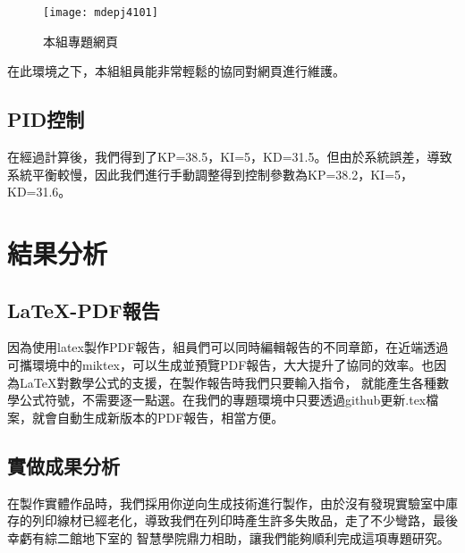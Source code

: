 \begin{figure}[h]
    \centering
    \texttt{[image: mdepj4101]}
    \caption{本組專題網頁}
\end{figure}

在此環境之下，本組組員能非常輕鬆的協同對網頁進行維護。\\




\subsection{PID控制}
在經過計算後，我們得到了KP=38.5，KI=5，KD=31.5。但由於系統誤差，導致系統平衡較慢，因此我們進行手動調整得到控制參數為KP=38.2，KI=5，KD=31.6。\\



\section{結果分析}

\subsection{LaTeX-PDF報告}
因為使用latex製作PDF報告，組員們可以同時編輯報告的不同章節，在近端透過可攜環境中的miktex，可以生成並預覽PDF報告，大大提升了協同的效率。也因為LaTeX對數學公式的支援，在製作報告時我們只要輸入指令，
就能產生各種數學公式符號，不需要逐一點選。在我們的專題環境中只要透過github更新.tex檔案，就會自動生成新版本的PDF報告，相當方便。\\

\subsection{實做成果分析}
在製作實體作品時，我們採用你逆向生成技術進行製作，由於沒有發現實驗室中庫存的列印線材已經老化，導致我們在列印時產生許多失敗品，走了不少彎路，最後幸虧有綜二館地下室的
智慧學院鼎力相助，讓我們能夠順利完成這項專題研究。\\

